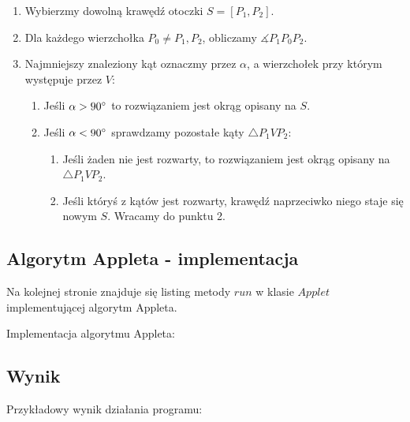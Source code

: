 \documentclass[hidelinks]{article}
\begin{document}
\begin{enumerate}

\item Wybierzmy dowolną krawędź otoczki $S  = [P_1, P_2]$.

\item Dla każdego wierzchołka $P_0 \neq P_1, P_2$, 
obliczamy $ \measuredangle P_1 P_0 P_2 $. 

\item Najmniejszy znaleziony kąt oznaczmy przez $\alpha$, 
a wierzchołek przy którym występuje przez $V$:

\begin{enumerate}

\item Jeśli $ \alpha > 90 \degree $ to rozwiązaniem jest okrąg opisany na $S$. 
\item  Jeśli $ \alpha < 90 \degree $ sprawdzamy pozostałe 
kąty $ \triangle P_1 V P_2 $:

\begin{enumerate}
\item  Jeśli żaden nie jest rozwarty, to rozwiązaniem 
jest okrąg opisany na $ \triangle P_1 V P_2 $.

\item Jeśli któryś z kątów jest rozwarty, krawędź naprzeciwko niego
staje się nowym $S$. Wracamy do punktu 2.

\end{enumerate}

\end{enumerate}

\end{enumerate}

\subsection{Algorytm Appleta - implementacja}

Na kolejnej stronie znajduje się listing metody $run$ w klasie $Applet$ implementującej algorytm Appleta.

Implementacja algorytmu Appleta:
\begin{center}

\end{center}

\restoregeometry


\subsection{Wynik}
Przykładowy wynik działania programu: \\ ~ \\
\end{document}
